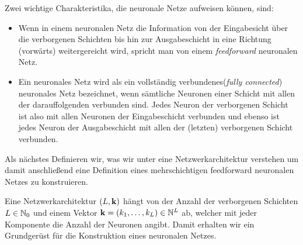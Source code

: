 %        
%        
%        
%        
%        
%    
%    
Zwei wichtige Charakteristika, die neuronale Netze aufweisen können, sind:
\begin{itemize}
\item Wenn in einem neuronalen Netz die Information von der Eingabesicht über die verborgenen Schichten bis hin zur Ausgabeschicht in eine Richtung (\glqq vorwärts\grqq) weitergereicht wird, spricht man von einem \textit{feedforward} neuronalen Netz.
\item Ein neuronales Netz wird als ein \glqq vollständig verbundenes\grqq\@ (\textit{fully connected}) neuronales Netz bezeichnet, wenn sämtliche Neuronen einer Schicht mit allen der darauffolgenden verbunden sind. Jedes Neuron der verborgenen Schicht ist also mit allen Neuronen der Eingabeschicht verbunden und ebenso ist jedes Neuron der Ausgabeschicht mit allen der (letzten) verborgenen Schicht verbunden.
\end{itemize}
Als nächstes Definieren wir, was wir unter eine Netzwerkarchitektur verstehen um damit anschließend eine Definition eines mehrschichtigen feedforward neuronalen Netzes zu konstruieren.
\begin{defn}
Eine Netzwerkarchitektur $(L, \mathbf{k})$ hängt von der Anzahl der verborgenen Schichten $L \in \mathbb{N}_0$ und einem Vektor $\mathbf{k} = (k_1,\dots,k_L) \in \mathbb{N}^L$ ab, welcher mit jeder Komponente die Anzahl der Neuronen angibt. Damit erhalten wir ein Grundgerüst für die Konstruktion eines neuronalen Netzes.
\end{defn}
